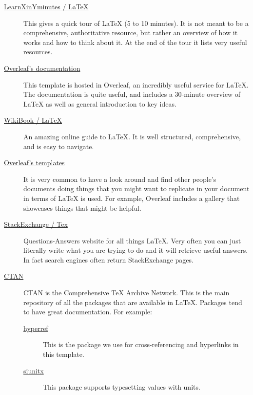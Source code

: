 \begin{description}
  \item[\href{https://learnxinyminutes.com/docs/latex}{LearnXinYminutes / LaTeX}]
    This gives a quick tour of \LaTeX{} (5 to 10 minutes).
    It is not meant to be a comprehensive, authoritative resource, but rather an overview of how it works and how to think about it.
    At the end of the tour it lists very useful resources.

  \item[\href{https://www.overleaf.com/learn}{Overleaf's documentation}]
    This template is hosted in Overleaf, an incredibly useful service for \LaTeX{}.
    The documentation is quite useful, and includes a 30-minute overview of \LaTeX{} as well as general introduction to key ideas.
  
  \item[\href{https://en.wikibooks.org/wiki/LaTeX}{WikiBook / LaTeX}]
    An amazing online guide to \LaTeX{}.
    It is well structured, comprehensive, and is easy to navigate.

  \item[\href{https://www.overleaf.com/gallery}{Overleaf's templates}]
    It is very common to have a look around and find other people's documents doing things that you might want to replicate in your document in terms of \LaTeX{} is used.
    For example, Overleaf includes a gallery that showcases things that might be helpful.

  \item[\href{https://tex.stackexchange.com/}{StackExchange / Tex}]
    Questions-Answers website for all things \LaTeX{}.
    Very often you can just literally write what you are trying to do
    and it will retrieve useful answers.
    In fact search engines often return StackExchange pages.

  \item[\href{https://ctan.org/}{CTAN}]
    CTAN is the Comprehensive TeX Archive Network.
    This is the main repository of all the packages that are available in \LaTeX{}.
    Packages tend to have great documentation.
    For example:
    \begin{description}
        \item[\href{https://ctan.org/pkg/hyperref}{hyperref}] 
            This is the package we use for cross-referencing and hyperlinks
            in this template.
        \item[\href{https://ctan.org/pkg/siunitx}{siunitx}]
            This package supports typesetting values with units.
    \end{description}
\end{description}



